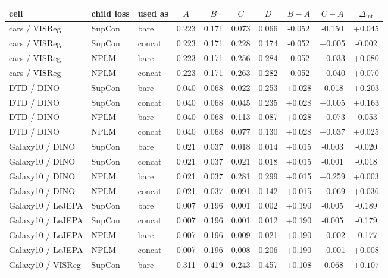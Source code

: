 \begin{table}[t]
\centering
\footnotesize
\begin{tabular}{lllccccccc}
\toprule
cell & child loss & used as & $A$ & $B$ & $C$ & $D$ & $B{-}A$ & $C{-}A$ & $\Delta_{\text{int}}$ \\
\midrule
cars / VISReg & SupCon & bare & 0.223 & 0.171 & 0.073 & 0.066 & -0.052 & -0.150 & +0.045 \\
cars / VISReg & SupCon & concat & 0.223 & 0.171 & 0.228 & 0.174 & -0.052 & +0.005 & -0.002 \\
cars / VISReg & NPLM & bare & 0.223 & 0.171 & 0.256 & 0.284 & -0.052 & +0.033 & +0.080 \\
cars / VISReg & NPLM & concat & 0.223 & 0.171 & 0.263 & 0.282 & -0.052 & +0.040 & +0.070 \\
DTD / DINO & SupCon & bare & 0.040 & 0.068 & 0.022 & 0.253 & +0.028 & -0.018 & $\mathbf{+0.203}$ \\
DTD / DINO & SupCon & concat & 0.040 & 0.068 & 0.045 & 0.235 & +0.028 & +0.005 & $\mathbf{+0.163}$ \\
DTD / DINO & NPLM & bare & 0.040 & 0.068 & 0.113 & 0.087 & +0.028 & +0.073 & -0.053 \\
DTD / DINO & NPLM & concat & 0.040 & 0.068 & 0.077 & 0.130 & +0.028 & +0.037 & +0.025 \\
Galaxy10 / DINO & SupCon & bare & 0.021 & 0.037 & 0.018 & 0.014 & +0.015 & -0.003 & -0.020 \\
Galaxy10 / DINO & SupCon & concat & 0.021 & 0.037 & 0.021 & 0.018 & +0.015 & -0.001 & -0.018 \\
Galaxy10 / DINO & NPLM & bare & 0.021 & 0.037 & 0.281 & 0.299 & +0.015 & +0.259 & +0.003 \\
Galaxy10 / DINO & NPLM & concat & 0.021 & 0.037 & 0.091 & 0.142 & +0.015 & +0.069 & +0.036 \\
Galaxy10 / LeJEPA & SupCon & bare & 0.007 & 0.196 & 0.001 & 0.002 & +0.190 & -0.005 & -0.189 \\
Galaxy10 / LeJEPA & SupCon & concat & 0.007 & 0.196 & 0.001 & 0.012 & +0.190 & -0.005 & -0.179 \\
Galaxy10 / LeJEPA & NPLM & bare & 0.007 & 0.196 & 0.009 & 0.021 & +0.190 & +0.002 & -0.177 \\
Galaxy10 / LeJEPA & NPLM & concat & 0.007 & 0.196 & 0.008 & 0.206 & +0.190 & +0.001 & +0.008 \\
Galaxy10 / VISReg & SupCon & bare & 0.311 & 0.419 & 0.243 & 0.457 & +0.108 & -0.068 & $\mathbf{+0.107}$ \\

\end{tabular}
\end{table}
